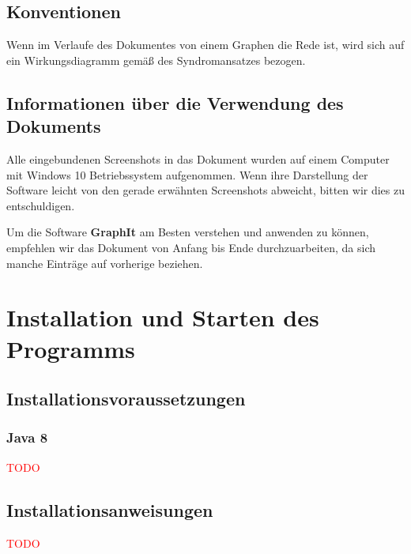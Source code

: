 \documentclass[enabledeprecatedfontcommands,fontsize=11pt,paper=a4,twoside]{scrartcl}
\newcommand*{\red}{\textcolor{red}}
\newcounter{one}
\newcounter{two}[one]
\let\tempone\itemize
\let\temptwo\enditemize
\renewenvironment{itemize}{\tempone\addtolength{\itemsep}{-10.0pt}}{\temptwo}
\begin{document}
\subsection{Konventionen}
\begin{itemize}
	\item Wenn im Verlaufe des Dokumentes von einem Graphen die Rede ist, wird sich auf ein Wirkungsdiagramm  gemäß des Syndromansatzes bezogen.
\end{itemize}

\subsection{Informationen über die Verwendung des Dokuments}

\begin{itemize}
	\item Alle eingebundenen Screenshots in das Dokument wurden auf einem Computer mit Windows 10 Betriebssystem aufgenommen. Wenn ihre Darstellung der Software leicht von den gerade erwähnten Screenshots abweicht, bitten wir dies zu entschuldigen.
	\item Um die Software \textbf{GraphIt} am Besten verstehen und anwenden zu können, empfehlen wir das Dokument von Anfang bis Ende durchzuarbeiten, da sich manche Einträge auf vorherige beziehen. 
\end{itemize}



\newpage
\section{Installation und Starten des Programms} \label{sec:installation}

\subsection{Installationsvoraussetzungen}
\subsubsection{Java 8}
\red{TODO}

\subsection{Installationsanweisungen}
\begin{itemize}
	\item \red{TODO}
\end{itemize}
\end{document}
